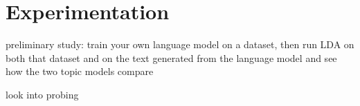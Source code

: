 \chapter{Experimentation}\label{chp:experimentation}
preliminary study: train your own language model on a dataset, then run LDA on both that dataset and on the text generated from the language model and see how the two topic models compare

look into probing